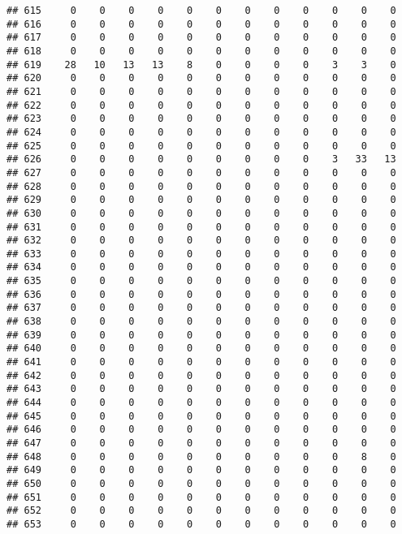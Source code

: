\documentclass[]{article}
\begin{document}
\begin{verbatim}
## 615     0    0    0    0    0    0    0    0    0    0    0    0
## 616     0    0    0    0    0    0    0    0    0    0    0    0
## 617     0    0    0    0    0    0    0    0    0    0    0    0
## 618     0    0    0    0    0    0    0    0    0    0    0    0
## 619    28   10   13   13    8    0    0    0    0    3    3    0
## 620     0    0    0    0    0    0    0    0    0    0    0    0
## 621     0    0    0    0    0    0    0    0    0    0    0    0
## 622     0    0    0    0    0    0    0    0    0    0    0    0
## 623     0    0    0    0    0    0    0    0    0    0    0    0
## 624     0    0    0    0    0    0    0    0    0    0    0    0
## 625     0    0    0    0    0    0    0    0    0    0    0    0
## 626     0    0    0    0    0    0    0    0    0    3   33   13
## 627     0    0    0    0    0    0    0    0    0    0    0    0
## 628     0    0    0    0    0    0    0    0    0    0    0    0
## 629     0    0    0    0    0    0    0    0    0    0    0    0
## 630     0    0    0    0    0    0    0    0    0    0    0    0
## 631     0    0    0    0    0    0    0    0    0    0    0    0
## 632     0    0    0    0    0    0    0    0    0    0    0    0
## 633     0    0    0    0    0    0    0    0    0    0    0    0
## 634     0    0    0    0    0    0    0    0    0    0    0    0
## 635     0    0    0    0    0    0    0    0    0    0    0    0
## 636     0    0    0    0    0    0    0    0    0    0    0    0
## 637     0    0    0    0    0    0    0    0    0    0    0    0
## 638     0    0    0    0    0    0    0    0    0    0    0    0
## 639     0    0    0    0    0    0    0    0    0    0    0    0
## 640     0    0    0    0    0    0    0    0    0    0    0    0
## 641     0    0    0    0    0    0    0    0    0    0    0    0
## 642     0    0    0    0    0    0    0    0    0    0    0    0
## 643     0    0    0    0    0    0    0    0    0    0    0    0
## 644     0    0    0    0    0    0    0    0    0    0    0    0
## 645     0    0    0    0    0    0    0    0    0    0    0    0
## 646     0    0    0    0    0    0    0    0    0    0    0    0
## 647     0    0    0    0    0    0    0    0    0    0    0    0
## 648     0    0    0    0    0    0    0    0    0    0    8    0
## 649     0    0    0    0    0    0    0    0    0    0    0    0
## 650     0    0    0    0    0    0    0    0    0    0    0    0
## 651     0    0    0    0    0    0    0    0    0    0    0    0
## 652     0    0    0    0    0    0    0    0    0    0    0    0
## 653     0    0    0    0    0    0    0    0    0    0    0    0

\end{verbatim}
\end{document}
